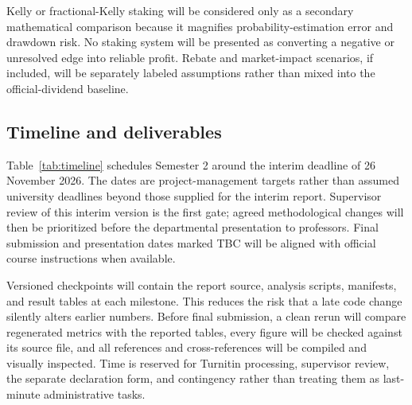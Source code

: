 Kelly or fractional-Kelly staking will be considered only as a secondary mathematical comparison because it magnifies probability-estimation error and drawdown risk. No staking system will be presented as converting a negative or unresolved edge into reliable profit. Rebate and market-impact scenarios, if included, will be separately labeled assumptions rather than mixed into the official-dividend baseline.

\subsection{Timeline and deliverables}\label{sec:plan-timeline}
Table~\ref{tab:timeline} schedules Semester 2 around the interim deadline of 26 November 2026. The dates are project-management targets rather than assumed university deadlines beyond those supplied for the interim report. Supervisor review of this interim version is the first gate; agreed methodological changes will then be prioritized before the departmental presentation to professors. Final submission and presentation dates marked TBC will be aligned with official course instructions when available.

Versioned checkpoints will contain the report source, analysis scripts, manifests, and result tables at each milestone. This reduces the risk that a late code change silently alters earlier numbers. Before final submission, a clean rerun will compare regenerated metrics with the reported tables, every figure will be checked against its source file, and all references and cross-references will be compiled and visually inspected. Time is reserved for Turnitin processing, supervisor review, the separate declaration form, and contingency rather than treating them as last-minute administrative tasks.

